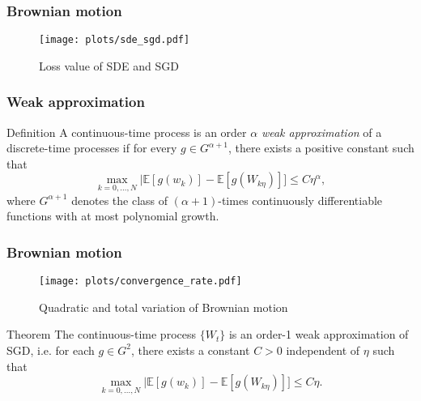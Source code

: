 \documentclass[17pt,institute=e10]{tuhh_presentation}
\newcommand{\E}[1]{\mathbb{E}\left[{#1} \right]}
\begin{document}
\begin{frame}[fragile]
  \frametitle{Brownian motion}
    \vspace{-1cm}
    \begin{figure}
      \hspace*{-4.7cm}
      \texttt{[image: plots/sde\_sgd.pdf]}
      \caption{Loss value of SDE and SGD}
    \end{figure}
\end{frame}

\begin{frame}
  \frametitle{Weak approximation}
\begin{block}{Definition}
  A continuous-time process is an order $\alpha$ \emph{\textcolor{purple-pontifex}{weak approximation}} of a discrete-time processes if for every $g \in G^{\alpha + 1}$, there exists a positive constant such that
  \begin{equation*}
    \max_{k=0,\dots,N} |\E{g(w_k)} - \E{g(W_{k\eta})}] \leq C \eta^\alpha,
  \end{equation*}
  where $G^{\alpha+1}$ denotes the class of $(\alpha+1)$-times continuously differentiable functions with at most polynomial growth.
\end{block}
\end{frame}

\begin{frame}[fragile]
  \frametitle{Brownian motion}
    \vspace{-1cm}
    \begin{figure}
      \centering
      \texttt{[image: plots/convergence\_rate.pdf]}
      \caption{Quadratic and total variation of Brownian motion}
    \end{figure}
\end{frame}

\begin{frame}
\begin{block}{Theorem \autocite{liStochasticModifiedEquations2019}}
  The continuous-time process $\{W_t\}$ is an order-1 weak approximation of SGD, i.e. for each $g \in G^2$, there exists a constant $C > 0$ independent of $\eta$ such that
  \begin{equation*}
    \max_{k=0,\dots,N} |\E{g(w_k)} - \E{g(W_{k\eta})}] \leq C \eta.
  \end{equation*}
\end{block}
\end{frame}
\end{document}
